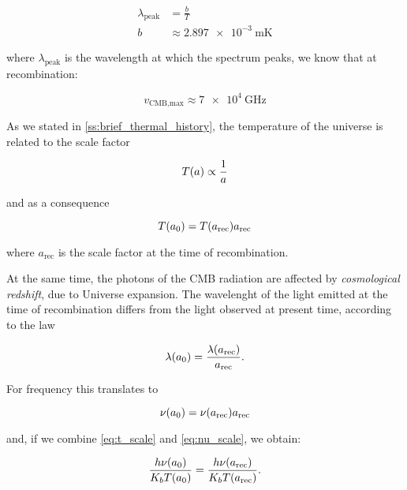 \begin{align}
        \lambda_{\text{peak}} & = \frac{b}{T} \\
        b & \approx \SI{2.897e-3}{\meter\kelvin}
\end{align}

where $\lambda_{\text{peak}}$ is the wavelength at which the spectrum
peaks, we know that at recombination:

\begin{equation}
        v_{\text{CMB,max}} \approx \SI{7e4}{\giga\hertz} 
\end{equation}

As we stated in \autoref{ss:brief_thermal_history}, the temperature of the
universe is related to the scale factor

\begin{equation}
        T\qty(a) \propto \frac{1}{a}
\end{equation}

and as a consequence

\begin{equation}
        T\qty(a_0) = T\qty(a_{\text{rec}}) a_{\text{rec}}
        \label{eq:t_scale}
\end{equation}

where $a_{\text{rec}}$ is the scale factor at the time of recombination.

At the same time, the photons of the CMB radiation are affected by \emph{cosmological
redshift}, due to Universe expansion. The wavelenght of the light emitted
at the time of recombination differs from the light observed at present
time, according to the law

\begin{equation}
        \lambda\qty(a_0) = \frac{\lambda\qty(a_{\text{rec}})}{a_{\text{rec}}}.
\end{equation}

For frequency this translates to

\begin{equation}
        \nu\qty(a_0) = \nu\qty(a_{\text{rec}}) a_{\text{rec}} 
        \label{eq:nu_scale}
\end{equation}

and, if we combine \autoref{eq:t_scale} and \autoref{eq:nu_scale}, we
obtain:

\begin{equation}
        \frac{h \nu\qty(a_0)}{K_b T\qty(a_0)} =
        \frac{h \nu\qty(a_{\text{rec}})}{K_b T\qty(a_{\text{rec}})}.
\end{equation}

